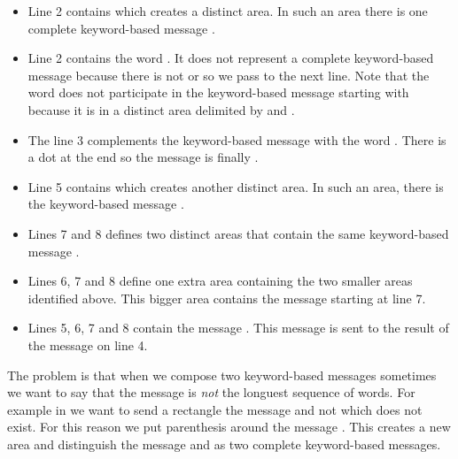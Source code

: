 \documentclass[a4paper,10pt,twoside]{book}
\begin{document}
\begin{itemize}
\item Line 2 contains  which creates a distinct area. In such an area there is one complete keyword-based message .

\item Line 2 contains the word . It does not represent a complete keyword-based message because there is not  or \ct{;} so we pass to the next line. Note that the word  does not participate in the keyword-based message starting with  because it is in a distinct area delimited by \ct{(} and \ct{)}.

\item The line 3 complements the keyword-based message with  the word . There is a dot at the end so the message is finally .

\item Line 5 contains  which creates another distinct area. In such an area, there is the keyword-based message .

\item Lines 7 and 8 defines two distinct areas that contain the same keyword-based message .

\item Lines 6, 7 and 8 define one extra area  containing the two smaller areas identified above. This bigger area contains the message  starting at line 7.

\item Lines 5, 6, 7 and 8 contain the message . This message is sent to the result of the message  on line 4.
\end{itemize}



The problem is that when we compose two keyword-based messages sometimes we want to say
that the message is \textit{not} the longuest sequence of words. For example in   we want to send a rectangle the message  and not  which does not exist. For this reason we put parenthesis around the message . This creates a new area and distinguish the message  and  as two complete keyword-based messages.
\end{document}
